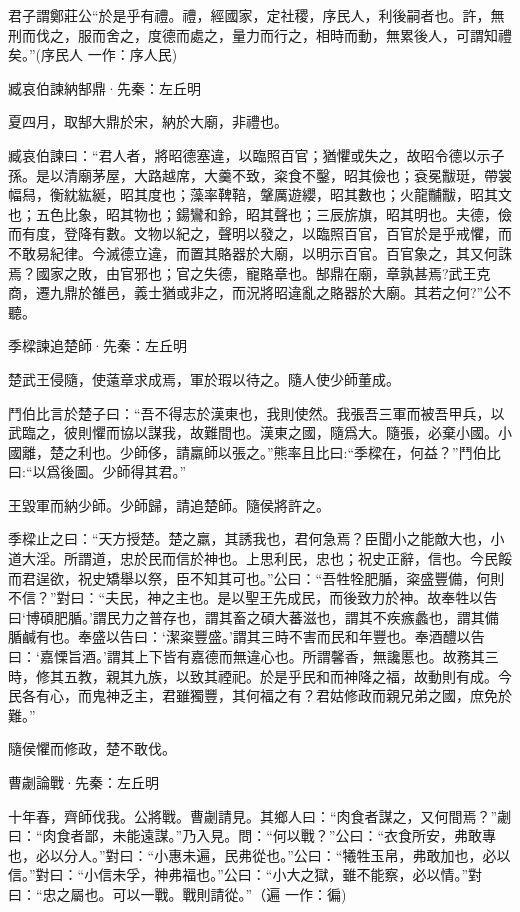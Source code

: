 \documentclass[12pt,a4paper]{ctexbook}
\begin{document}
君子謂鄭莊公“於是乎有禮。禮，經國家，定社稷，序民人，利後嗣者也。許，無刑而伐之，服而舍之，度德而處之，量力而行之，相時而動，無累後人，可謂知禮矣。”(序民人 一作：序人民)\par
臧哀伯諫納郜鼎·先秦：左丘明 \par
夏四月，取郜大鼎於宋，納於大廟，非禮也。\par
臧哀伯諫曰：“君人者，將昭德塞違，以臨照百官；猶懼或失之，故昭令德以示子孫。是以清廟茅屋，大路越席，大羹不致，粢食不鑿，昭其儉也；袞冕黻珽，帶裳幅舄，衡紞紘綖，昭其度也；藻率鞞鞛，鞶厲遊纓，昭其數也；火龍黼黻，昭其文也；五色比象，昭其物也；鍚鸞和鈴，昭其聲也；三辰旂旗，昭其明也。夫德，儉而有度，登降有數。文物以紀之，聲明以發之，以臨照百官，百官於是乎戒懼，而不敢易紀律。今滅德立違，而置其賂器於大廟，以明示百官。百官象之，其又何誅焉？國家之敗，由官邪也；官之失德，寵賂章也。郜鼎在廟，章孰甚焉?武王克商，遷九鼎於雒邑，義士猶或非之，而況將昭違亂之賂器於大廟。其若之何?”公不聽。\par
季樑諫追楚師·先秦：左丘明 \par
楚武王侵隨，使薳章求成焉，軍於瑕以待之。隨人使少師董成。\par
鬥伯比言於楚子曰：“吾不得志於漢東也，我則使然。我張吾三軍而被吾甲兵，以武臨之，彼則懼而協以謀我，故難間也。漢東之國，隨爲大。隨張，必棄小國。小國離，楚之利也。少師侈，請羸師以張之。”熊率且比曰:“季樑在，何益？”鬥伯比曰:“以爲後圖。少師得其君。”\par
王毀軍而納少師。少師歸，請追楚師。隨侯將許之。\par
季樑止之曰：“天方授楚。楚之羸，其誘我也，君何急焉？臣聞小之能敵大也，小道大淫。所謂道，忠於民而信於神也。上思利民，忠也；祝史正辭，信也。今民餒而君逞欲，祝史矯舉以祭，臣不知其可也。”公曰：“吾牲牷肥腯，粢盛豐備，何則不信？”對曰：“夫民，神之主也。是以聖王先成民，而後致力於神。故奉牲以告曰‘博碩肥腯。’謂民力之普存也，謂其畜之碩大蕃滋也，謂其不疾瘯蠡也，謂其備腯鹹有也。奉盛以告曰：‘潔粢豐盛。’謂其三時不害而民和年豐也。奉酒醴以告曰：‘嘉慄旨酒。’謂其上下皆有嘉德而無違心也。所謂馨香，無讒慝也。故務其三時，修其五教，親其九族，以致其禋祀。於是乎民和而神降之福，故動則有成。今民各有心，而鬼神乏主，君雖獨豐，其何福之有？君姑修政而親兄弟之國，庶免於難。”\par
隨侯懼而修政，楚不敢伐。\par
曹劌論戰·先秦：左丘明 \par
十年春，齊師伐我。公將戰。曹劌請見。其鄉人曰：“肉食者謀之，又何間焉？”劌曰：“肉食者鄙，未能遠謀。”乃入見。問：“何以戰？”公曰：“衣食所安，弗敢專也，必以分人。”對曰：“小惠未遍，民弗從也。”公曰：“犧牲玉帛，弗敢加也，必以信。”對曰：“小信未孚，神弗福也。”公曰：“小大之獄，雖不能察，必以情。”對曰：“忠之屬也。可以一戰。戰則請從。”（遍 一作：徧)\par
\end{document}
